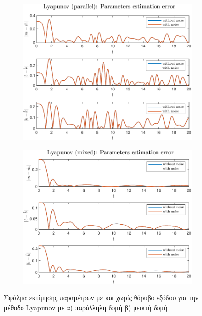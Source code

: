 \documentclass[a4paper,12pt]{article}
\begin{document}
\begin{figure}[h!]
    \centering
    \begin{subfigure}{0.45\textwidth}
        \centering
        \includegraphics[width=\linewidth]{plot/task1_parameter_estimation_error_lyapunov_parallel_noise.pdf}
        \caption{}
        \label{fig:task1_parameter_estimation_error_lyapunov_parallel_noise}
    \end{subfigure}
    \hfill
    \begin{subfigure}{0.45\textwidth}
        \centering
        \includegraphics[width=\linewidth]{plot/task1_parameter_estimation_error_lyapunov_mixed_noise.pdf}
        \caption{}
        \label{fig:task1_parameter_estimation_error_lyapunov_mixed_noise}
    \end{subfigure}
    \caption{Σφάλμα εκτίμησης παραμέτρων με και χωρίς θόρυβο εξόδου για την μέθοδο
    Lyapunov με 
    α) παράλληλη δομή β) μεικτή δομή}
    \label{fig:task1_parameter_estimation_error_lyapunov_noise}
\end{figure}
\end{document}
